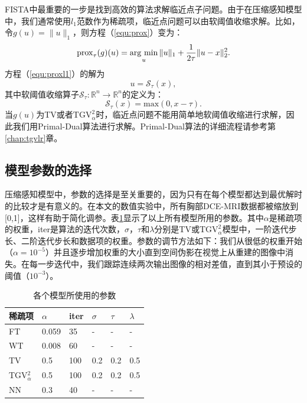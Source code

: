 FISTA中最重要的一步是找到高效的算法求解临近点子问题。由于在压缩感知模型中，我们通常使用$l_1$范数作为稀疏项，临近点问题可以由软阈值收缩求解。比如，令$g(u) = \|u\|_1$，则方程（\ref{equ:prox}）变为：
\begin{equation}
\prox_\tau(g)(u)=\argmin_u{\|u\|_1+\frac{1}{2\tau}}\|u-x\|_2^2.
\label{equ:proxl1}
\end{equation}
方程（\ref{equ:proxl1}）的解为
\begin{equation}
u=\mathscr{S}_{\tau}(x),
\end{equation}
其中软阈值收缩算子$\mathscr{S}_{\tau}:\mathbb{R}^n\xrightarrow{} \mathbb{R}^n$的定义为：
\begin{equation}
\mathscr{S}_{\tau}(x)=
\mathrm{max}(0, x-\tau).
\end{equation}
当$g(u)$为TV或者$\mathrm{TGV}_\alpha^2$时，临近点问题不能用简单地软阈值收缩进行求解，因此我们用Primal-Dual算法进行求解。Primal-Dual算法的详细流程请参考第\ref{chap:tgvlr}章。

\subsection{模型参数的选择}
压缩感知模型中，参数的选择是至关重要的，因为只有在每个模型都达到最优解时的比较才是有意义的。在本文的数值实验中，所有胸部DCE-MRI数据都被缩放到[0,1]，这样有助于简化调参。表\ref{tab:params4}显示了以上所有模型所用的参数。其中$\alpha$是稀疏项的权重，iter是算法的迭代次数，$\sigma$，$\tau$和$\lambda$分别是TV或$\mathrm{TGV}_\alpha^2$模型中，一阶迭代步长、二阶迭代步长和数据项的权重。参数的调节方法如下：我们从很低的权重开始（$\alpha=10^{-5}$）并且逐步增加权重的大小直到空间伪影在视觉上从重建的图像中消失。在每一步迭代中，我们跟踪连续两次输出图像的相对差值，直到其小于预设的阈值（$10^{-3}$）。

\begin{table}
\setlength{\belowcaptionskip}{10pt}
\caption{各个模型所使用的参数}
\centering
\begin{tabular}{|l|l|l|l|l|l|}
\hline
\hline
稀疏项 & $\alpha$ & iter & $\sigma$ & $\tau$ & $\lambda$\\
\hline
FT & 0.059 & 35 & - & - & -\\
\hline
WT & 0.008 & 60 & - & - & -\\
\hline
TV & 0.5 & 100 & 0.2 & 0.2 & 0.5\\
\hline
TGV$_{\alpha}^2$ & 0.5 & 100 & 0.2 & 0.2 & 0.5\\
\hline
NN & 0.3 & 40 & - & - & -\\
\hline
\end{tabular}
\label{tab:params4}
\end{table}

